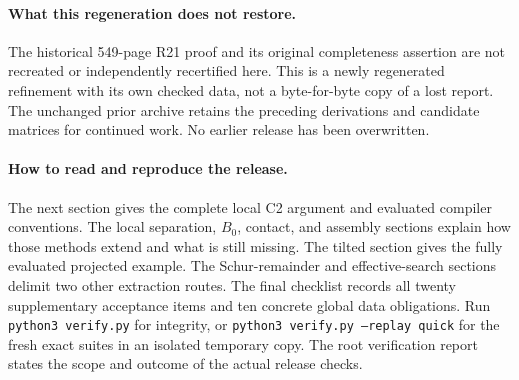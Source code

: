 \documentclass[11pt,a4paper]{article}
\theoremstyle{definition}
\theoremstyle{remark}
\begin{document}
\paragraph{What this regeneration does not restore.}
The historical 549-page R21 proof and its original completeness assertion
are not recreated or independently recertified here. This is a newly
regenerated refinement with its own checked data, not a byte-for-byte copy
of a lost report. The unchanged prior archive retains the preceding
derivations and candidate matrices for continued work. No earlier release
has been overwritten.

\paragraph{How to read and reproduce the release.}
The next section gives the complete local C2 argument and evaluated
compiler conventions. The local separation, $B_0$, contact, and assembly
sections explain how those methods extend and what is still missing.
The tilted section gives the fully evaluated projected example. The
Schur-remainder and effective-search sections delimit two other extraction
routes. The final checklist records all twenty supplementary acceptance
items and ten concrete global data obligations. Run
\texttt{python3 verify.py} for integrity, or
\texttt{python3 verify.py --replay quick} for the fresh exact suites in an
isolated temporary copy. The root verification report states the scope
and outcome of the actual release checks.

\tableofcontents
\clearpage







\end{document}
